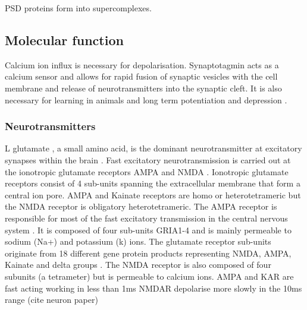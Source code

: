 PSD proteins form into supercomplexes. 





\subsection{Molecular function}
Calcium ion influx is necessary for depolarisation. Synaptotagmin acts as a calcium sensor and allows for rapid fusion of synaptic vesicles with the cell membrane and release of neurotransmitters into the synaptic cleft.\cite{martens2007synaptotagmin}  It is also necessary for  learning in animals and long term potentiation and depression \cite{lisman2012mechanisms}.
\subsubsection{Neurotransmitters}
L glutamate , a small amino acid, is the dominant neurotransmitter at excitatory synapses within the brain \cite{niswender2010metabotropic}. Fast excitatory neurotransmission is carried out at the ionotropic glutamate receptors AMPA and NMDA \cite{traynelis2010glutamate}. Ionotropic glutamate receptors consist of 4 sub-units spanning the extracellular membrane that form a central ion pore. AMPA and Kainate receptors are homo or heterotetrameric but the NMDA receptor is obligatory heterotetrameric. The AMPA receptor is responsible for most of the fast excitatory transmission in the central nervous system \cite{henley2013ampa}. It is composed of four sub-units GRIA1-4 and is mainly permeable to sodium (Na+) and potassium (k) ions. The glutamate receptor sub-units originate from 18 different gene protein products representing NMDA, AMPA, Kainate and delta groups \cite{traynelis2010glutamate}. The NMDA receptor is also composed of four subunits (a tetrameter)  but is permeable to calcium ions. AMPA and KAR are fast acting working in less than 1ms \cite{traynelis2010glutamate} NMDAR depolarise more slowly in the 10ms range (cite neuron paper) 

